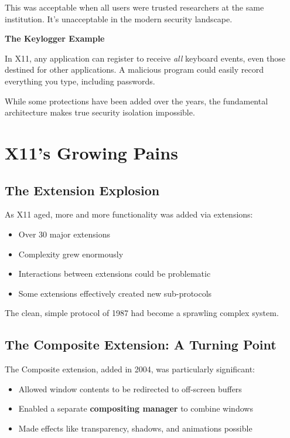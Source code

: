 This was acceptable when all users were trusted researchers at the same institution. It's unacceptable in the modern security landscape.

\begin{warningbox}
\textbf{The Keylogger Example}

In X11, any application can register to receive \textit{all} keyboard events, even those destined for other applications. A malicious program could easily record everything you type, including passwords.

While some protections have been added over the years, the fundamental architecture makes true security isolation impossible.
\end{warningbox}

\section{X11's Growing Pains}

\subsection{The Extension Explosion}

As X11 aged, more and more functionality was added via extensions:

\begin{itemize}[leftmargin=*]
    \item Over 30 major extensions
    \item Complexity grew enormously
    \item Interactions between extensions could be problematic
    \item Some extensions effectively created new sub-protocols
\end{itemize}

The clean, simple protocol of 1987 had become a sprawling complex system.

\subsection{The Composite Extension: A Turning Point}

The Composite extension, added in 2004, was particularly significant:

\begin{itemize}[leftmargin=*]
    \item Allowed window contents to be redirected to off-screen buffers
    \item Enabled a separate \textbf{compositing manager} to combine windows
    \item Made effects like transparency, shadows, and animations possible
\end{itemize}

